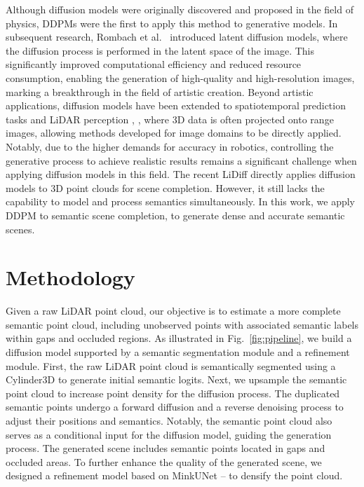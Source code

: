 \documentclass[conference]{IEEEtran}
\begin{document}
Although diffusion models were originally discovered and proposed in the field of physics, DDPMs \cite{jho2022} were the first to apply this method to generative models.
In subsequent research, Rombach et al.\ \cite{rrombach2025} introduced latent diffusion models, where the diffusion process is performed in the latent space of the image.
This significantly improved computational efficiency and reduced resource consumption, enabling the generation of high-quality and high-resolution images, marking a breakthrough in the field of artistic creation.
Beyond artistic applications, diffusion models have been extended to spatiotemporal prediction tasks \cite{hzeng2025} and LiDAR perception \cite{knakashimaandr2025}, \cite{vzyrianov2024}, where 3D data is often projected onto range images, allowing methods developed for image domains to be directly applied.
Notably, due to the higher demands for accuracy in robotics, controlling the generative process to achieve realistic results remains a significant challenge when applying diffusion models in this field.
The recent LiDiff \cite{lnunes2025} directly applies diffusion models to 3D point clouds for scene completion.
However, it still lacks the capability to model and process semantics simultaneously.
In this work, we apply DDPM to semantic scene completion, to generate dense and accurate semantic scenes.

\section{Methodology}

Given a raw LiDAR point cloud, our objective is to estimate a more complete semantic point cloud, including unobserved points with associated semantic labels within gaps and occluded regions.
As illustrated in Fig.~\ref{fig:pipeline}, we build a diffusion model supported by a semantic segmentation module and a refinement module.
First, the raw LiDAR point cloud is semantically segmented using a Cylinder3D \cite{xzhu2021} to generate initial semantic logits.
Next, we upsample the semantic point cloud to increase point density for the diffusion process.
The duplicated semantic points undergo a forward diffusion and a reverse denoising process to adjust their positions and semantics.
Notably, the semantic point cloud also serves as a conditional input for the diffusion model, guiding the generation process.
The generated scene includes semantic points located in gaps and occluded areas.
To further enhance the quality of the generated scene, we designed a refinement model based on MinkUNet \cite{choy2019a}--\cite{jgwak} to densify the point cloud.
\end{document}
